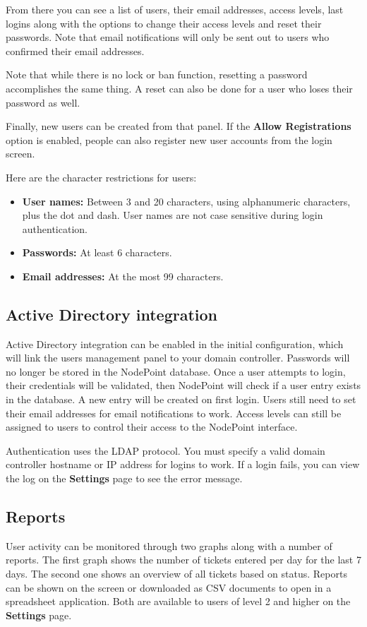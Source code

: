 \documentclass[11pt]{article}
\begin{document}
From there you can see a list of users, their email addresses, access levels, last logins along with the options to change their access levels and reset their passwords. Note that email notifications will only be sent out to users who confirmed their email addresses.

Note that while there is no lock or ban function, resetting a password accomplishes the same thing. A reset can also be done for a user who loses their password as well.

Finally, new users can be created from that panel. If the \textbf{Allow Registrations} option is enabled, people can also register new user accounts from the login screen.

Here are the character restrictions for users:

\begin{itemize}
\item \textbf{User names:} Between 3 and 20 characters, using alphanumeric characters, plus the dot and dash. User names are not case sensitive during login authentication.
\item \textbf{Passwords:} At least 6 characters.
\item \textbf{Email addresses:} At the most 99 characters.
\end{itemize}

\subsection{Active Directory integration}
Active Directory integration can be enabled in the initial configuration, which will link the users management panel to your domain controller. Passwords will no longer be stored in the NodePoint database. Once a user attempts to login, their credentials will be validated, then NodePoint will check if a user entry exists in the database. A new entry will be created on first login. Users still need to set their email addresses for email notifications to work. Access levels can still be assigned to users to control their access to the NodePoint interface.

Authentication uses the LDAP protocol. You must specify a valid domain controller hostname or IP address for logins to work. If a login fails, you can view the log on the \textbf{Settings} page to see the error message.

\subsection{Reports}
User activity can be monitored through two graphs along with a number of reports. The first graph shows the number of tickets entered per day for the last 7 days. The second one shows an overview of all tickets based on status. Reports can be shown on the screen or downloaded as CSV documents to open in a spreadsheet application. Both are available to users of level 2 and higher on the \textbf{Settings} page.
\end{document}
